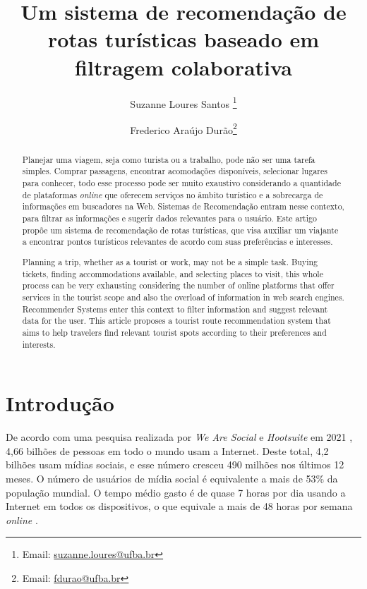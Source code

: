 \documentclass[portuguese]{textolivre}
\title{Um sistema de recomendação de rotas turísticas baseado em filtragem colaborativa}
\author[1]{Suzanne Loures Santos \orcid{0000-0003-3251-4850}\thanks{Email: \href{mailto:suzanne.loures@ufba.br}{suzanne.loures@ufba.br}}}
\author[1]{Frederico Araújo Durão\orcid{0000-0002-7766-6666}\thanks{Email: \href{mailto:fdurao@ufba.br}{fdurao@ufba.br}}}
\affil[1]{Universidade Federal da Bahia, Instituto de Computação, Salvador, BA, Brasil.}
\begin{document}
\maketitle

\begin{polyabstract}
\begin{abstract}
Planejar uma viagem, seja como turista ou a trabalho, pode não ser uma tarefa simples. Comprar passagens, encontrar acomodações disponíveis, selecionar lugares para conhecer, todo esse processo pode ser muito exaustivo considerando a quantidade de plataformas \textit{online} que oferecem serviços no âmbito turístico e a sobrecarga de informações em buscadores na Web. Sistemas de Recomendação entram nesse contexto, para filtrar as informações e sugerir dados relevantes para o usuário. Este artigo propõe um sistema de recomendação de rotas turísticas, que visa auxiliar um viajante a encontrar pontos turísticos relevantes de acordo com suas preferências e interesses.

\end{abstract}

\begin{english}
\begin{abstract}
Planning a trip, whether as a tourist or work, may not be a simple task. Buying tickets, finding accommodations available, and selecting places to visit, this whole process can be very exhausting considering the number of online platforms that offer services in the tourist scope and also the overload of information in web search engines. Recommender Systems enter this context to filter information and suggest relevant data for the user. This article proposes a tourist route recommendation system that aims to help travelers find relevant tourist spots according to their preferences and interests.

\end{abstract}
\end{english}
\end{polyabstract}

\section{Introdução}\label{sec-intro}
De acordo com uma pesquisa realizada por \textit{We Are Social} e \textit{Hootsuite} em 2021 \cite{hootsuite2021digital}, 4,66 bilhões de pessoas em todo o mundo usam a Internet. Deste total, 4,2 bilhões usam mídias sociais, e esse número cresceu 490 milhões nos últimos 12 meses. O número de usuários de mídia social é equivalente a mais de 53\% da população mundial. O tempo médio gasto é de quase 7 horas por dia usando a Internet em todos os dispositivos, o que equivale a mais de 48 horas por semana \textit{online} \cite{WeAreSocial}.
\end{document}
